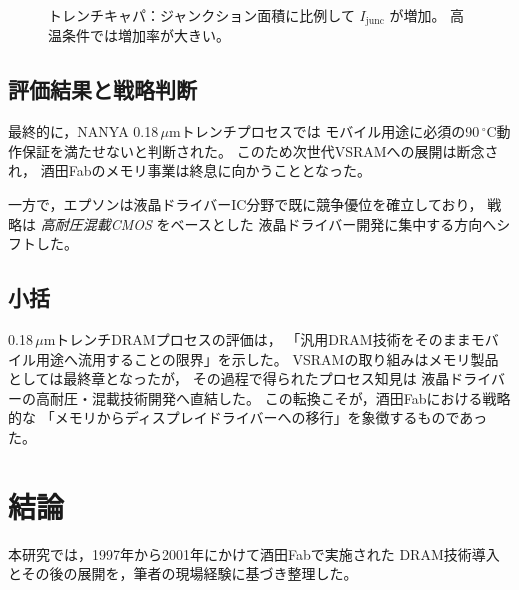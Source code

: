 \documentclass[conference]{IEEEtran}
\begin{document}
\begin{figure}[t]
\centering
{}
\caption{トレンチキャパ：ジャンクション面積に比例して $I_{\mathrm{junc}}$ が増加。
高温条件では増加率が大きい。}
\label{fig:trench_area_leak}
\end{figure}

\subsection{評価結果と戦略判断}
最終的に，NANYA 0.18\,$\mu$mトレンチプロセスでは
モバイル用途に必須の90\,$^\circ$C動作保証を満たせないと判断された。
このため次世代VSRAMへの展開は断念され，
酒田Fabのメモリ事業は終息に向かうこととなった。

一方で，エプソンは液晶ドライバーIC分野で既に競争優位を確立しており，
戦略は \emph{高耐圧混載CMOS} をベースとした
液晶ドライバー開発に集中する方向へシフトした。

\subsection{小括}
0.18\,$\mu$mトレンチDRAMプロセスの評価は，
「汎用DRAM技術をそのままモバイル用途へ流用することの限界」を示した。
VSRAMの取り組みはメモリ製品としては最終章となったが，
その過程で得られたプロセス知見は
液晶ドライバーの高耐圧・混載技術開発へ直結した。
この転換こそが，酒田Fabにおける戦略的な
「メモリからディスプレイドライバーへの移行」を象徴するものであった。

\section{結論}

本研究では，1997年から2001年にかけて酒田Fabで実施された
DRAM技術導入とその後の展開を，筆者の現場経験に基づき整理した。
\end{document}
